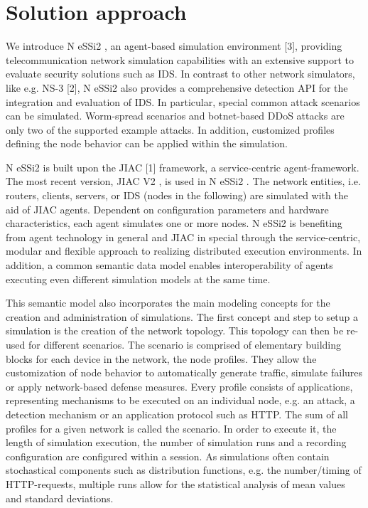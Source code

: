 \documentclass[sigconf]{aamas}
\begin{document}

\section{Solution approach}

We introduce N eSSi2 , an agent-based simulation environment [3], providing telecommunication network simulation capabilities with an extensive support to evaluate security solutions such as IDS. In contrast to other network simulators, like e.g. NS-3 [2], N eSSi2 also provides a comprehensive detection API for the integration and evaluation of IDS. In particular, special common attack scenarios can be simulated. Worm-spread scenarios and botnet-based DDoS attacks are only two of the supported example attacks. In
addition, customized profiles defining the node behavior can be applied within the simulation.

N eSSi2 is built upon the JIAC [1] framework, a service-centric agent-framework. The most recent version, JIAC V2 , is used in N eSSi2 . The network entities, i.e. routers, clients, servers, or IDS (nodes in the following) are simulated with the aid of JIAC agents. Dependent on configuration parameters and hardware characteristics, each agent simulates one or more nodes. N eSSi2 is benefiting from agent technology in general and JIAC in special through the service-centric, modular and flexible approach to realizing distributed execution environments. In addition, a common semantic data model enables interoperability of agents executing even different simulation models at the same time.

This semantic model also incorporates the main modeling concepts for the creation and administration of simulations.
The first concept and step to setup a simulation is the creation of the network topology. This topology can then be re-used for different scenarios. The scenario is comprised of elementary building blocks for each device in the network, the node profiles. They allow the customization of node behavior to automatically generate traffic, simulate failures or apply network-based defense measures. Every profile consists of applications, representing mechanisms to be executed on an individual node, e.g. an attack, a detection mechanism or an application protocol such as HTTP. The sum of all profiles for a given network is called the scenario. In order to execute it, the length of simulation execution, the number of simulation runs and a recording configuration are configured within a session. As simulations often contain stochastical components such as distribution functions, e.g. the number/timing of HTTP-requests, multiple runs allow for the statistical analysis of mean values and standard deviations.
\end{document}
